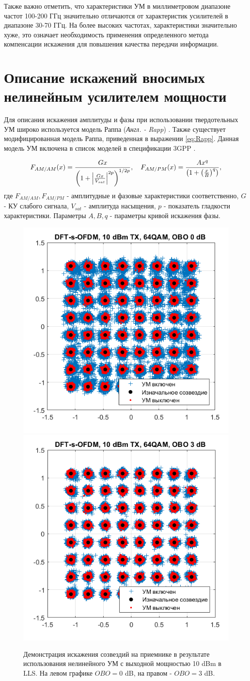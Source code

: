 \documentclass{unn}
\begin{document}
Также важно отметить, что характеристики УМ в миллиметровом диапазоне
частот 100-200 ГГц значительно отличаются от характеристик усилителей в
диапазоне 30-70 ГГц. На более высоких частотах, характеристики значительно
хуже, это означает необходимость применения определенного метода
компенсации искажения для повышения качества передачи информации.

\section{Описание искажений вносимых нелинейным усилителем мощности}
Для описания искажения амплитуды и фазы при использовании твердотельных УМ
широко используется модель Раппа (\textit{Англ. - Rapp}) \cite{Rapp1991} \cite{Maltsev2010}.
Также существует модифицированная модель Раппа, приведенная в выражении
\ref{eq:Rapp}. Данная модель УМ включена в список моделей в спецификации
3GPP \cite{3gpp.38.803}.

\begin{equation}
    F_{AM/AM}(x) = \frac{G x}{\left( 1 + \abs{\frac{Gx}{V_{sat}}}^{2p}\right)^{1/2p}},
    \quad 
    F_{AM/PM}(x) = \frac{Ax^q}{\left(1+\left(\frac{x}{B}\right)^q\right)},
    \label{eq:Rapp}
\end{equation}
где $F_{AM/AM}, F_{AM/PM}$ - амплитудные и фазовые характеристики
соответственно, $G$ - КУ слабого сигнала, $V_{sat}$ - амплитуда насыщения,
$p$ - показатель гладкости характеристики. Параметры $A,B,q$ - параметры
кривой искажения фазы.

\begin{figure}[h!]
  \centering
  \includegraphics[width=0.35\linewidth]{figs/dfts_10dbm_obo0.png}
  \includegraphics[width=0.35\linewidth]{figs/dfts_10dbm_obo3.png}
  \caption{Демонстрация искажения созвездий на приемнике в результате
  использования нелинейного УМ с выходной мощностью 10 dBm в LLS. На левом
  графике $OBO=0$ dB, на правом - $OBO=3$ dB.}
  \label{fig:lls_rapp_distortions_10dbm}
\end{figure}
\end{document}
